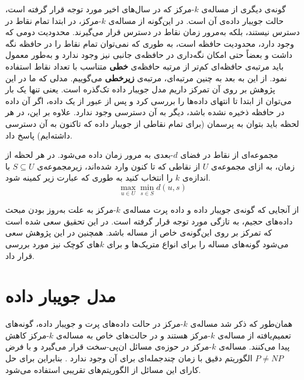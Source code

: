 گونه‌ی دیگری از مساله‌ی $k$-مرکز که در سال‌های اخیر مورد توجه قرار گرفته است، حالت جویبار داده‌ی آن است. در این‌گونه از مساله‌ی $k$-مرکز، در ابتدا تمام نقاط در دسترس نیستند، بلکه به‌مرور زمان نقاط در دسترس قرار می‌گیرند. محدودیت دومی که وجود دارد، محدودیت حافظه است، به طوری که نمی‌توان تمام نقاط را در حافظه نگه داشت و بعضاً حتی امکان نگه‌داری در حافظه‌ی جانبی نیز وجود ندارد و به‌طور معمول باید مرتبه‌ی حافظه‌ای کم‌تر از مرتبه حافظه‌ی \textbf{خطی} متناسب با تعداد نقاط استفاده نمود. از این به بعد به چنین مرتبه‌ای، مرتبه‌ی \textbf{زیرخطی} می‌گوییم. مدلی که ما در این پژوهش بر روی آن تمرکز داریم مدل جویبار داده تک‌گذره \cite{aggarwal2007data} است. یعنی تنها یک بار می‌توان از ابتدا تا انتهای داده‌ها را بررسی کرد و پس از عبور از یک داده، اگر آن داده در حافظه ذخیره نشده باشد، دیگر به آن دسترسی وجود ندارد. علاوه بر این، در هر لحظه باید بتوان به پرسمان (برای تمام نقاطی از جویبار داده که تاکنون به آن دسترسی داشته‌ایم) پاسخ داد.

\begin{prb}
مجموعه‌ای از نقاط در فضای $d$-بعدی به مرور زمان داده می‌شود. در هر لحظه از زمان، به ازای مجموعه‌ی $U$ از نقاطی که تا کنون وارد شده‌اند، زیرمجموعه‌ی $S \subseteq U$ با اندازه‌ی $k$ را انتخاب کنید به ‌طوری ‌که عبارت زیر کمینه شود.
\begin{equation}
\max_{u \in U} \min_{s \in S} d(u, s)
\end{equation}
\end{prb}

از آنجایی که گونه‌ی جویبار داده و داده پرت مساله‌ی $k$-مرکز به علت به‌روز بودن مبحث داده‌های حجیم، به تازگی مورد توجه قرار گرفته است. در این تحقیق سعی شده است که تمرکز بر روی این‌گونه‌ی خاص از مساله باشد. همچنین در این پژوهش سعی می‌شود گونه‌های مساله را برای انواع متریک‌ها و برای $k$های کوچک نیز مورد بررسی قرار داد. 

\section{مدل جویبار داده}
همان‌طور که ذکر شد مساله‌ی $k$-مرکز در حالت داده‌های پرت و جویبار داده، گونه‌های تعمیم‌یافته از مساله‌ی $k$-مرکز هستند و در حالت‌های خاص به مساله‌ی $k$-مرکز کاهش پیدا می‌کنند. مساله‌ی $k$-مرکز در حوزه‌ی مسائل ان‌پی-سخت قرار می‌گیرد و با فرض $P \neq NP$ الگوریتم دقیق با زمان چندجمله‌ای برای آن وجود ندارد \cite{michael1979computers}. بنابراین برای حل کارای این مسائل از الگوریتم‌های تقریبی استفاده می‌شود.


